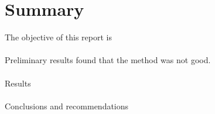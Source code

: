 \chapter{Summary}
	\noindent
	The objective of this report is \\
	\\
	Preliminary results found that the method was not good.\\ 
	\\
	Results\\
	\\
	Conclusions and recommendations


%
%
